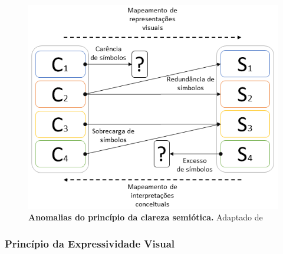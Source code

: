 
\begin{figure}[h]
    \includegraphics[scale=0.8]{2-fundamentacao-teorica/imagens/clareza-semiotica.png}
    \centering
    \caption[Anomalias do princípio da clareza semiótica.]{\textbf{Anomalias do princípio da clareza semiótica.} Adaptado de~\cite{MOODY-2009-Physics-Notation}}
    \label{elementofig:anomalias-clareza-semiotica}
\end{figure}

\subsubsection{Princípio da Expressividade Visual}\label{2-fundamentacao-notacao-visual-principio-expressividade-visal}

